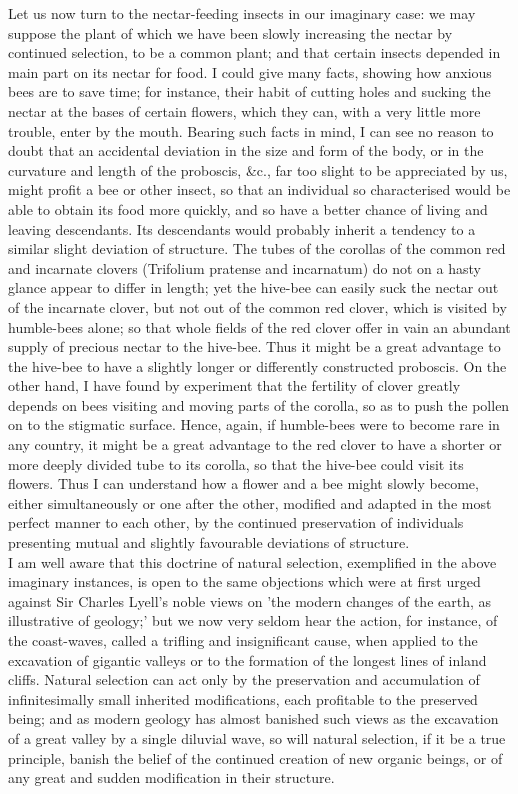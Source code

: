 \indent Let us now turn to the nectar-feeding insects in our imaginary case: we may suppose the plant of which we have been slowly increasing the nectar by continued selection, to be a common plant; and that certain insects depended in main part on its nectar for food. I could give many facts, showing how anxious bees are to save time; for instance, their habit of cutting holes and sucking the nectar at the bases of certain flowers, which they can, with a very little more trouble, enter by the mouth. Bearing such facts in mind, I can see no reason to doubt that an accidental deviation in the size and form of the body, or in the curvature and length of the proboscis, \&c., far too slight to be appreciated by us, might profit a bee or other insect, so that an individual so characterised would be able to obtain its food more quickly, and so have a better chance of living and leaving descendants. Its descendants would probably inherit a tendency to a similar slight deviation of structure. The tubes of the corollas of the common red and incarnate clovers (Trifolium pratense and incarnatum) do not on a hasty glance appear to differ in length; yet the hive-bee can easily suck the nectar out of the incarnate clover, but not out of the common red clover, which is visited by humble-bees alone; so that whole fields of the red clover offer in vain an abundant supply of precious nectar to the hive-bee.  Thus it might be a great advantage to the hive-bee to have a slightly longer or differently constructed proboscis. On the other hand, I have found by experiment that the fertility of clover greatly depends on bees visiting and moving parts of the corolla, so as to push the pollen on to the stigmatic surface. Hence, again, if humble-bees were to become rare in any country, it might be a great advantage to the red clover to have a shorter or more deeply divided tube to its corolla, so that the hive-bee could visit its flowers. Thus I can understand how a flower and a bee might slowly become, either simultaneously or one after the other, modified and adapted in the most perfect manner to each other, by the continued preservation of individuals presenting mutual and slightly favourable deviations of structure. \\
\indent I am well aware that this doctrine of natural selection, exemplified in the above imaginary instances, is open to the same objections which were at first urged against Sir Charles Lyell's noble views on 'the modern changes of the earth, as illustrative of geology;' but we now very seldom hear the action, for instance, of the coast-waves, called a trifling and insignificant cause, when applied to the excavation of gigantic valleys or to the formation of the longest lines of inland cliffs. Natural selection can act only by the preservation and accumulation of infinitesimally small inherited modifications, each profitable to the preserved being; and as modern geology has almost banished such views as the excavation of a great valley by a single diluvial wave, so will natural selection, if it be a true principle, banish the belief of the continued creation of new organic beings, or of any great and sudden modification in their structure. \\

